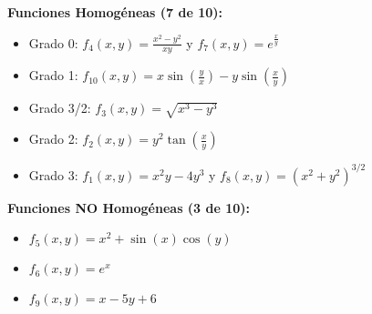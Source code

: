 \documentclass[a4paper,12pt]{article}
\begin{document}
\textbf{Funciones Homogéneas (7 de 10):}
\begin{itemize}
    \item Grado 0: $f_4(x,y) = \frac{x^2-y^2}{xy}$ y $f_7(x,y) = e^{\frac{x}{y}}$
    \item Grado 1: $f_{10}(x,y) = x\sin\left(\frac{y}{x}\right) - y\sin\left(\frac{x}{y}\right)$
    \item Grado 3/2: $f_3(x,y) = \sqrt{x^3-y^3}$
    \item Grado 2: $f_2(x,y) = y^2\tan\left(\frac{x}{y}\right)$
    \item Grado 3: $f_1(x,y) = x^2y-4y^3$ y $f_8(x,y) = (x^2+y^2)^{3/2}$
\end{itemize}

\textbf{Funciones NO Homogéneas (3 de 10):}
\begin{itemize}
    \item $f_5(x,y) = x^2 + \sin(x)\cos(y)$
    \item $f_6(x,y) = e^x$
    \item $f_9(x,y) = x - 5y + 6$
\end{itemize}
\end{document}
